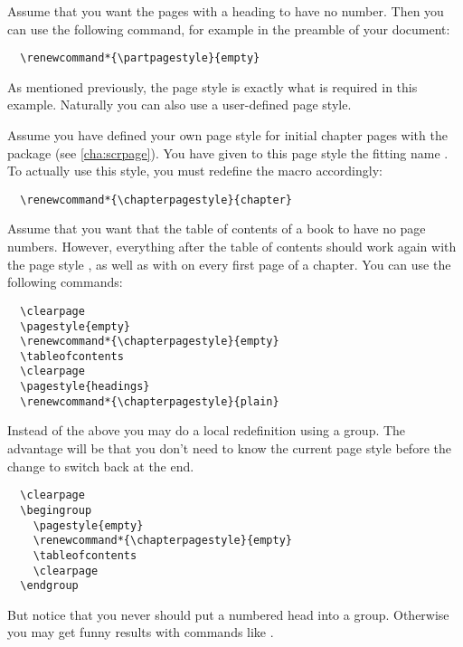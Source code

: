 \begin{Example}
  Assume that you want the pages with a  heading to have
  no number. Then you can use the following command, for example in
  the preamble of your document:
\begin{lstlisting}
  \renewcommand*{\partpagestyle}{empty}
\end{lstlisting}
  As mentioned previously, the page style  is exactly
  what is required in this example. Naturally you can also use a
  user-defined page style.

  Assume you have defined your own page style for initial chapter pages
  with the package  (see
  \autoref{cha:scrpage}). You have given to this page style the
  fitting name . To actually use this style, you must
  redefine the macro  accordingly:
\begin{lstlisting}
  \renewcommand*{\chapterpagestyle}{chapter}
\end{lstlisting}

  Assume that you want that the table of contents of a book to
  have no page numbers. However,  everything after the table of
  contents should work
  again with the page style , as well as with
   on every first page of a chapter. You can use the
  following commands:
\begin{lstlisting}
  \clearpage
  \pagestyle{empty}
  \renewcommand*{\chapterpagestyle}{empty}
  \tableofcontents
  \clearpage
  \pagestyle{headings}
  \renewcommand*{\chapterpagestyle}{plain}
\end{lstlisting}
  Instead of the above you may do a local redefinition using a group. The
  advantage will be that you don't need to know the current page style before
  the change to switch back at the end.
\begin{lstlisting}
  \clearpage
  \begingroup
    \pagestyle{empty}
    \renewcommand*{\chapterpagestyle}{empty}
    \tableofcontents
    \clearpage
  \endgroup
\end{lstlisting}
  But notice that you never should put a numbered head into a group. Otherwise
  you may get funny results with commands like .
\end{Example}



